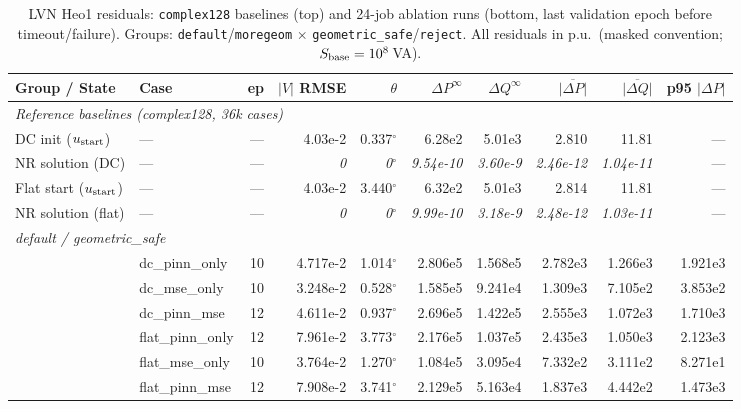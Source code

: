 \documentclass{article}
\begin{document}
\begin{table}[h]
\centering
\caption{LVN Heo1 residuals: \texttt{complex128} baselines (top) and
  24-job ablation runs (bottom, last validation epoch before
  timeout/failure).  Groups: \texttt{default}/\texttt{moregeom}
  $\times$ \texttt{geometric\_safe}/\texttt{reject}.
  All residuals in p.u.\ (masked convention;
  $S_{\rm base}=10^8$\,VA).}
\label{tab:c128}
\setlength{\tabcolsep}{2.5pt}
\footnotesize
\begin{tabular}{llrrrrrrrr}
\toprule
Group / State & Case & ep
  & $|V|$ RMSE & $\theta$
  & $\Delta P^\infty$ & $\Delta Q^\infty$
  & $\overline{|\Delta P|}$ & $\overline{|\Delta Q|}$
  & p95 $|\Delta P|$ \\
\midrule
\multicolumn{10}{l}{\textit{Reference baselines (complex128, 36k cases)}} \\
DC init ($u_{\rm start}$)       & --- & --- & 4.03e-2 & 0.337\ensuremath{^\circ} & 6.28e2 & 5.01e3 & 2.810 & 11.81 & --- \\
\rowcolor{bestgreen}
NR solution (DC)                & --- & --- & \textit{0} & \textit{0\ensuremath{^\circ}} & \textit{9.54e-10} & \textit{3.60e-9} & \textit{2.46e-12} & \textit{1.04e-11} & --- \\
Flat start ($u_{\rm start}$)    & --- & --- & 4.03e-2 & 3.440\ensuremath{^\circ} & 6.32e2 & 5.01e3 & 2.814 & 11.81 & --- \\
\rowcolor{bestgreen}
NR solution (flat)              & --- & --- & \textit{0} & \textit{0\ensuremath{^\circ}} & \textit{9.99e-10} & \textit{3.18e-9} & \textit{2.48e-12} & \textit{1.03e-11} & --- \\
\midrule
\multicolumn{10}{l}{\textit{default / geometric\_safe}} \\
& dc\_pinn\_only  & 10 & 4.717e-2 & 1.014\ensuremath{^\circ} & 2.806e5 & 1.568e5 & 2.782e3 & 1.266e3 & 1.921e3 \\
& dc\_mse\_only   & 10 & 3.248e-2 & 0.528\ensuremath{^\circ} & 1.585e5 & 9.241e4 & 1.309e3 & 7.105e2 & 3.853e2 \\
& dc\_pinn\_mse   & 12 & 4.611e-2 & 0.937\ensuremath{^\circ} & 2.696e5 & 1.422e5 & 2.555e3 & 1.072e3 & 1.710e3 \\
& flat\_pinn\_only& 12 & 7.961e-2 & 3.773\ensuremath{^\circ} & 2.176e5 & 1.037e5 & 2.435e3 & 1.050e3 & 2.123e3 \\
& flat\_mse\_only & 10 & 3.764e-2 & 1.270\ensuremath{^\circ} & 1.084e5 & 3.095e4 & 7.332e2 & 3.111e2 & 8.271e1 \\
& flat\_pinn\_mse & 12 & 7.908e-2 & 3.741\ensuremath{^\circ} & 2.129e5 & 5.163e4 & 1.837e3 & 4.442e2 & 1.473e3 \\

\end{tabular}
\end{table}
\end{document}

